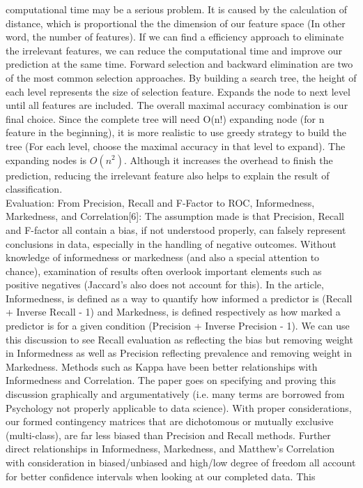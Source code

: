 \documentclass[acmtog, authorversion]{acmart}
\begin{document}
computational time may be a serious problem. It is caused by the calculation of distance, which is proportional the the dimension of our feature space 
(In other word, the number of features). If we can find a efficiency approach to eliminate the irrelevant features, we can reduce the computational time 
and improve our prediction at the same time. 
Forward selection and backward elimination are two of the most common selection approaches. By building a search tree, the height of each level represents 
the size of selection feature. Expands the node to next level until all features are included. The overall maximal accuracy combination is our final 
choice. Since the complete tree will need O(n!) expanding node (for n feature in the beginning), it is more realistic to use greedy strategy to build the 
tree (For each level, choose the maximal accuracy in that level to expand). The expanding nodes is $O(n^2)$. Although it increases the overhead to finish 
the prediction, reducing the irrelevant feature also helps to explain the result of classification.\\ 
Evaluation: From Precision, Recall and F-Factor to ROC, Informedness, Markedness, and Correlation[6]: The assumption made is that Precision, 
Recall and F-factor all contain a bias, if not understood properly, can falsely represent conclusions in data, especially in the handling of negative 
outcomes. Without knowledge of informedness or markedness (and also a special attention to chance), examination of results often overlook important 
elements such as positive negatives (Jaccard’s also does not account for this). In the article, Informedness, is defined as a way to quantify how 
informed a predictor is (Recall + Inverse Recall - 1) and Markedness, is defined respectively as how marked a predictor is for a given condition 
(Precision + Inverse Precision - 1). We can use this discussion to see Recall evaluation as reflecting the bias but removing weight in Informedness as 
well as Precision reflecting prevalence and removing weight in Markedness. Methods such as Kappa have been better relationships with Informedness and 
Correlation. The paper goes on specifying and proving this discussion graphically and argumentatively (i.e. many terms are borrowed from Psychology not 
properly applicable to data science). With proper considerations, our formed contingency matrices that are dichotomous or mutually exclusive 
(multi-class), are far less biased than Precision and Recall methods. Further direct relationships in Informedness, Markedness, and Matthew’s Correlation 
with consideration in biased/unbiased and high/low degree of freedom all account for better confidence intervals when looking at our completed data. This 
\end{document}

